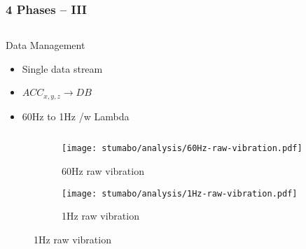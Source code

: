 \begin{frame}
    \frametitle{4 Phases -- III}
    \vspace*{\fill}
    \begin{columns}[onlytextwidth, c]
        \begin{column}{.47\textwidth}
            \begin{exampleblock}{Data Management}
                \begin{itemize}
                    \item Single data stream
                    \item  $ ACC_{x, y, z} \longrightarrow DB$
                    \item 60Hz to 1Hz /w Lambda
                \end{itemize}
            \end{exampleblock}
        \end{column}
        \begin{column}{.52\textwidth}
            \\
        \end{column}
    \end{columns}
    \begin{figure}[ht]
        \begin{subfigure}{0.495\textwidth}
            \centering
            \texttt{[image: stumabo/analysis/60Hz-raw-vibration.pdf]}
            \caption{60Hz raw vibration}
            \label{fig:stu_60Hz_raw}
        \end{subfigure}
        \begin{subfigure}{0.495\textwidth}
            \centering
            \texttt{[image: stumabo/analysis/1Hz-raw-vibration.pdf]}
            \caption{1Hz raw vibration}
            \label{fig:stu_1Hz_raw}
        \end{subfigure}
    \end{figure}
    \vspace*{\fill}
\end{frame}

